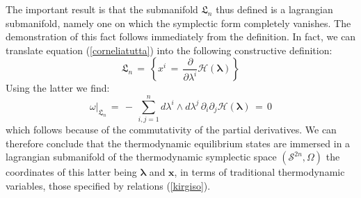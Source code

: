 \documentclass[10pt,a4paper]{article}
\begin{document}
The important result is that the submanifold $\mathfrak{L}_n$
thus defined is a lagrangian submanifold, namely one on which the symplectic form completely vanishes. The demonstration of this fact follows immediately from the definition. In fact, we can translate equation
(\ref{corneliatutta}) into the following constructive definition:
\begin{equation}\label{tarapizo}
    \mathfrak{L}_n \, = \,\left\{ x^i \, = \, \frac{\partial}{\partial \lambda^i}
    \mathcal{H}\left(\pmb{\lambda}\right)\right\}
\end{equation}
Using the latter we find:
\begin{equation}\label{adige}
    \left.\omega\right|_{\mathfrak{L}_n} \, = \,
    - \,\sum_{i,j=1}^{n} d\lambda^i \wedge d\lambda^j \, \partial_i\partial_j
    \mathcal{H}\left(\pmb{\lambda}\right) \, = \,0
\end{equation}
which follows because of the commutativity of the partial derivatives. We can therefore conclude that the thermodynamic  equilibrium states are immersed in a lagrangian submanifold of the thermodynamic symplectic space  $\left(\mathcal{S}^{2n},\Omega\right)$ the
coordinates of this latter being $\pmb{\lambda}$ and $\mathbf{x}$,
in terms of traditional thermodynamic variables, those specified by relations
(\ref{kirgiso}).
\end{document}

